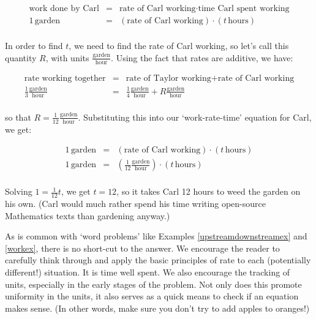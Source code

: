 {\[ \begin{array}{rcl}

\text{work done by Carl} & = & \text{rate of Carl working} \cdot \text{time Carl spent working} \\

1 \, \text{garden} & = & (\text{rate of Carl working}) \cdot (t \, \text{hours}) \\ \end{array} \]

In order to find $t$, we need to find the rate of Carl working, so let's call this quantity $R$, with units $\frac{\text{garden}}{\text{hour}}$.  Using the fact that rates are additive, we have:

\[ \begin{array}{rcl}

\text{rate working together} & = & \text{rate of Taylor working} + \text{rate of Carl working} \\ [5pt]

\frac{1}{3} \frac{\text{garden}}{\text{hour}} & = & \frac{1}{4} \frac{\text{garden}}{\text{hour}} + R \frac{\text{garden}}{\text{hour}} \\ \end{array} \]

so that $R = \frac{1}{12} \frac{\text{garden}}{\text{hour}}$.  Substituting this into our `work-rate-time' equation for Carl, we get:

\[ \begin{array}{rcl}

1 \, \text{garden} & = & (\text{rate of Carl working}) \cdot (t \, \text{hours}) \\ [5pt] 

1 \, \text{garden} & = & \left(\frac{1}{12} \frac{\text{garden}}{\text{hour}} \right) \cdot (t \, \text{hours}) \\ \end{array} \]

Solving $1 = \frac{1}{12} t$, we get $t = 12$, so it takes Carl 12 hours to weed the garden on his own. (Carl would much rather spend his time writing open-source Mathematics texts than gardening anyway.)
}

\medskip

As is common with `word problems' like Examples \ref{upstreamdownstreamex} and \ref{workex}, there is no short-cut to the answer.  We encourage the reader to carefully think through and apply the basic principles of rate to each (potentially different!) situation.  It is time well spent.  We also encourage the tracking of units, especially in the early stages of the problem.  Not only does this promote uniformity in the units, it also serves as a quick means to check if an equation makes sense. (In other words, make sure you don't try to add apples to oranges!)

